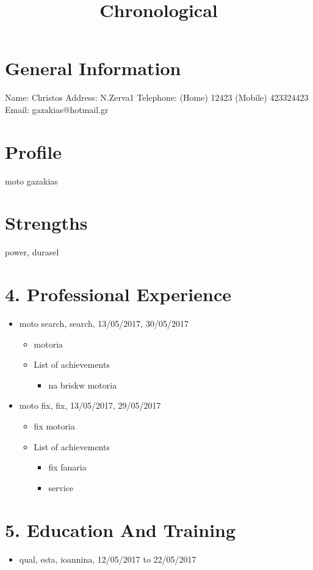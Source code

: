 \documentclass{article}
\title{Chronological}
\begin{document}
 
 \section{ General Information} 
 {Name: Christos} \newline 
 {Address: N.Zerva1} \newline 
 {Telephone: (Home) 12423}  	{(Mobile) 423324423} \newline 
 {Email: gazakias@hotmail.gr}
 \section{Profile} 
 {moto gazakias}
 \section{Strengths} 
 {power, durasel}
 \section{4. Professional Experience} 
\renewcommand{\labelitemii}{$\circ$} 
 \renewcommand{\labelitemiii}{\tiny$\blacksquare$} 
\begin{itemize} 
\item {moto search, search, 13/05/2017, 30/05/2017}
\begin{itemize} 
\item {motoria}
 \item {List of achievements}
\begin{itemize} 
\item {na briskw motoria}
\end{itemize} 
\end{itemize} 
\end{itemize} 
\begin{itemize} 
\item {moto fix, fix, 13/05/2017, 29/05/2017}
\begin{itemize} 
\item {fix motoria}
 \item {List of achievements}
\begin{itemize} 
\item {fix fanaria}
\item {service}
\end{itemize} 
\end{itemize} 
\end{itemize} 
 \section{5. Education And Training} 
\begin{itemize} 
\item {qual, esta, ioannina, 12/05/2017 to 22/05/2017}
\end{itemize} 
\end{document}
